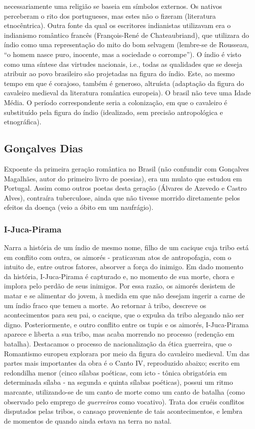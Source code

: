 necessariamente uma religião se baseia em símbolos externos. Os nativos perceberam o rito dos portugueses, mas estes não o fizeram (literatura etnocêntrica). Outra fonte da qual os escritores indianistas utilizavam era o indianismo romântico francês (François-René de Chateaubriand), que utilizara do índio como uma representação do mito do bom selvagem (lembre-se de Rousseau, ``o homem nasce puro, inocente, mas a sociedade o corrompe''). O índio é visto como uma síntese das virtudes nacionais, i.e., todas as qualidades que se deseja atribuir ao povo brasileiro são projetadas na figura do índio. Este, ao mesmo tempo em que é corajoso, também é generoso, altruísta (adaptação da figura do cavaleiro medieval da literatura romântica europeia). O brasil não teve uma Idade Média. O período correspondente seria a colonização, em que o cavaleiro é substituído pela figura do índio (idealizado, sem precisão antropológica e etnográfica).

\subsection{Gonçalves Dias}

Expoente da primeira geração romântica no Brasil (não confundir com Gonçalves Magalhães, autor do primeiro livro de poesias), era um mulato que estudou em Portugal. Assim como outros poetas desta geração (Álvares de Azevedo e Castro Alves), contraíra tuberculose, ainda que não tivesse morrido diretamente pelos efeitos da doença (veio a óbito em um naufrágio).

\subsubsection{I-Juca-Pirama}

Narra a história de um índio de mesmo nome, filho de um cacique cuja tribo está em conflito com outra, os aimorés - praticavam atos de antropofagia, com o intuito de, entre outros fatores, absorver a força do inimigo. Em dado momento da história, I-Juca-Pirama é capturado e, no momento de sua morte, chora e implora pelo perdão de seus inimigos. Por essa razão, os aimorés desistem de matar e se alimentar do jovem, à medida em que não desejam ingerir a carne de um índio fraco que temeu a morte. Ao retornar à tribo, descreve os acontecimentos para seu pai, o cacique, que o expulsa da tribo alegando não ser digno. Posteriormente, e outro conflito entre os tupis e os aimorés, I-Juca-Pirama aparece e liberta a sua tribo, mas acaba morrendo no processo (redenção em batalha). Destacamos o processo de nacionalização da ética guerreira, que o Romantismo europeu explorara por meio da figura do cavaleiro medieval. Um das partes mais importantes da obra é o Canto IV, reproduzido abaixo; escrito em redondilha menor (cinco sílabas poéticas, com icto - tônica obrigatória em determinada sílaba - na segunda e quinta sílabas poéticas), possui um ritmo marcante, utilizando-se de um canto de morte como um canto de batalha (como observado pelo emprego de \textit{guerreiros} como vocativo). Trata dos cruéis conflitos disputados pelas tribos, o cansaço proveniente de tais acontecimentos, e lembra de momentos de quando ainda estava na terra no natal.

